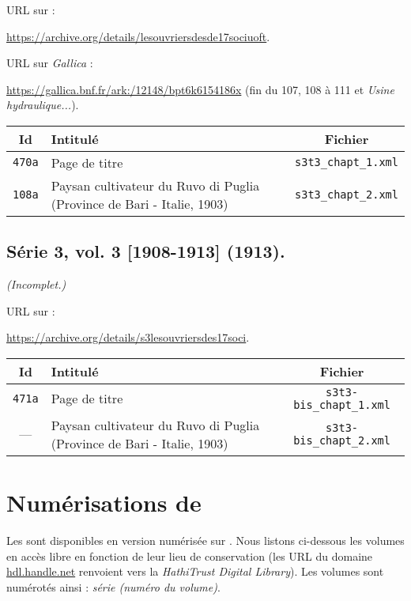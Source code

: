 URL sur \ia{} : 

\url{https://archive.org/details/lesouvriersdesde17sociuoft}.

URL sur \textit{Gallica} : 

\url{https://gallica.bnf.fr/ark:/12148/bpt6k6154186x} (fin du \no{} 107, \no{} 108 à 111 et \textit{Usine hydraulique...}).

\begin{center}
\begin{longtable}{ | c | p{9.5cm} | c | }
\hline
Id & Intitulé & Fichier \\ \hline
\texttt{470a} & Page de titre & \texttt{s3t3\_chapt\_1.xml} \\ \hline
\texttt{108a} & Paysan cultivateur du Ruvo di Puglia (Province de Bari - Italie, 1903) & \texttt{s3t3\_chapt\_2.xml} \\ \hline
\end{longtable}
\end{center}

\subsection{Série 3, vol. 3 [1908-1913] (1913).}
\label{mappings3t3bis}

\textit{(Incomplet.)}

URL sur \ia{} : 

\url{https://archive.org/details/s3lesouvriersdes17soci}.

\begin{center}
\begin{longtable}{ | c | p{9.5cm} | c | }
\hline
Id & Intitulé & Fichier \\ \hline
\texttt{471a} & Page de titre & \texttt{s3t3-bis\_chapt\_1.xml} \\ \hline
--- & Paysan cultivateur du Ruvo di Puglia (Province de Bari - Italie, 1903) & \texttt{s3t3-bis\_chapt\_2.xml} \\ \hline
\end{longtable}
\end{center}

\clearpage

\section{Numérisations de \gb}\label{numgb}

Les \odm{} sont disponibles en version numérisée sur \gb. Nous listons ci-dessous les volumes en accès libre en fonction de leur lieu de conservation (les URL du domaine \url{hdl.handle.net} renvoient vers la \textit{HathiTrust Digital Library}). Les volumes sont numérotés ainsi : \textit{série (numéro du volume)}.

